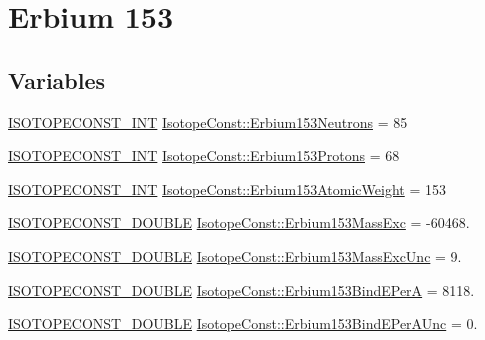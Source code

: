 \hypertarget{group___isotope_const-_erbium-_er153}{}\section{Erbium 153}
\label{group___isotope_const-_erbium-_er153}
\subsection*{Variables}
\begin{DoxyCompactItemize}
\item 
\mbox{\hyperlink{group___isotope_const-_macros_ga5f18360b3e99483a35c32d789e62621c}{I\+S\+O\+T\+O\+P\+E\+C\+O\+N\+S\+T\+\_\+\+I\+NT}} \mbox{\hyperlink{group___isotope_const-_erbium-_er153_gae1d38ced7b91eb662387a87cec813269}{Isotope\+Const\+::\+Erbium153\+Neutrons}} = 85
\item 
\mbox{\hyperlink{group___isotope_const-_macros_ga5f18360b3e99483a35c32d789e62621c}{I\+S\+O\+T\+O\+P\+E\+C\+O\+N\+S\+T\+\_\+\+I\+NT}} \mbox{\hyperlink{group___isotope_const-_erbium-_er153_ga8087419cfd653dc0ebc240c2b897f80a}{Isotope\+Const\+::\+Erbium153\+Protons}} = 68
\item 
\mbox{\hyperlink{group___isotope_const-_macros_ga5f18360b3e99483a35c32d789e62621c}{I\+S\+O\+T\+O\+P\+E\+C\+O\+N\+S\+T\+\_\+\+I\+NT}} \mbox{\hyperlink{group___isotope_const-_erbium-_er153_gaa1526ebafbb3bc6813b4ed81451c61d1}{Isotope\+Const\+::\+Erbium153\+Atomic\+Weight}} = 153
\item 
\mbox{\hyperlink{group___isotope_const-_macros_ga8f45a7272ce02c0b4c65c44636ed719a}{I\+S\+O\+T\+O\+P\+E\+C\+O\+N\+S\+T\+\_\+\+D\+O\+U\+B\+LE}} \mbox{\hyperlink{group___isotope_const-_erbium-_er153_gaa4aa47f10e05c18963b1ae737797284c}{Isotope\+Const\+::\+Erbium153\+Mass\+Exc}} = -\/60468.
\item 
\mbox{\hyperlink{group___isotope_const-_macros_ga8f45a7272ce02c0b4c65c44636ed719a}{I\+S\+O\+T\+O\+P\+E\+C\+O\+N\+S\+T\+\_\+\+D\+O\+U\+B\+LE}} \mbox{\hyperlink{group___isotope_const-_erbium-_er153_gab55d756b952e7222c17f6a344870721a}{Isotope\+Const\+::\+Erbium153\+Mass\+Exc\+Unc}} = 9.
\item 
\mbox{\hyperlink{group___isotope_const-_macros_ga8f45a7272ce02c0b4c65c44636ed719a}{I\+S\+O\+T\+O\+P\+E\+C\+O\+N\+S\+T\+\_\+\+D\+O\+U\+B\+LE}} \mbox{\hyperlink{group___isotope_const-_erbium-_er153_ga1ca7b7eedf609e19abb33dbd2f34f272}{Isotope\+Const\+::\+Erbium153\+Bind\+E\+PerA}} = 8118.
\item 
\mbox{\hyperlink{group___isotope_const-_macros_ga8f45a7272ce02c0b4c65c44636ed719a}{I\+S\+O\+T\+O\+P\+E\+C\+O\+N\+S\+T\+\_\+\+D\+O\+U\+B\+LE}} \mbox{\hyperlink{group___isotope_const-_erbium-_er153_gafa047de76826703f7475fd8efa1508ec}{Isotope\+Const\+::\+Erbium153\+Bind\+E\+Per\+A\+Unc}} = 0.

\end{DoxyCompactItemize}
